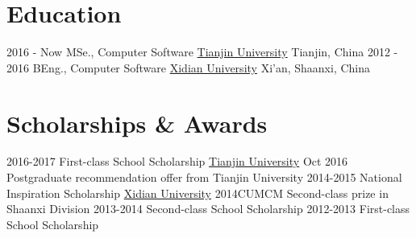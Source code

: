\documentclass[letterpaper]{twentysecondcv} %
\begin{document}
\makeprofile %

\section{Education}

\begin{twenty} %
	\twentyitem
    	{2016 - Now}
        {MSe., Computer Software}
        {\href{http://tju.edu.cn/}{Tianjin University}}
        {Tianjin, China}
        {}
    \twentyitem
    	{2012 - 2016}
        {BEng., Computer Software}
        {\href{http://www.xidian.edu.cn/}{Xidian University}}
        {Xi'an, Shaanxi, China}
        {}
\end{twenty}



\section{Scholarships \& Awards}

\begin{twenty}
    
    \twentyitem
        {2016-2017}
        {First-class School Scholarship}
        {\href{http://tju.edu.cn/}{Tianjin University}}
        {}
        {}
    \twentyitem
        {Oct 2016}
        {Postgraduate recommendation offer from Tianjin University}
        {}
        {}
        {}
    \twentyitem
        {2014-2015}
        {National Inspiration Scholarship}
        {\href{http://www.xidian.edu.cn/}{Xidian University}}
        {}
        {}
    \twentyitem
        {2014CUMCM}
        {Second-class prize in Shaanxi Division}
        {}
        {}
        {}
    \twentyitem
        {2013-2014}  
        {Second-class School Scholarship}
        {}
        {}
        {}
    \twentyitem        
        {2012-2013}
        {First-class School Scholarship}
        {}
        {}
        {}        
\end{twenty}
\end{document}

